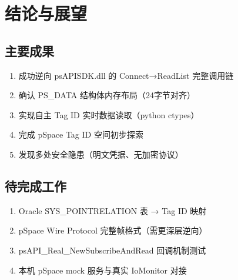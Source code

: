 \documentclass[12pt,a4paper]{ctexart}
\begin{document}
\section{结论与展望}

\subsection{主要成果}
\begin{enumerate}[leftmargin=*]
  \item 成功逆向 psAPISDK.dll 的 Connect→ReadList 完整调用链
  \item 确认 PS\_DATA 结构体内存布局（24字节对齐）
  \item 实现自主 Tag ID 实时数据读取（python ctypes）
  \item 完成 pSpace Tag ID 空间初步探索
  \item 发现多处安全隐患（明文凭据、无加密协议）
\end{enumerate}

\subsection{待完成工作}
\begin{enumerate}[leftmargin=*]
  \item Oracle SYS\_POINTRELATION 表 → Tag ID 映射
  \item pSpace Wire Protocol 完整帧格式（需更深层逆向）
  \item psAPI\_Real\_NewSubscribeAndRead 回调机制测试
  \item 本机 pSpace mock 服务与真实 IoMonitor 对接
\end{enumerate}
\end{document}

